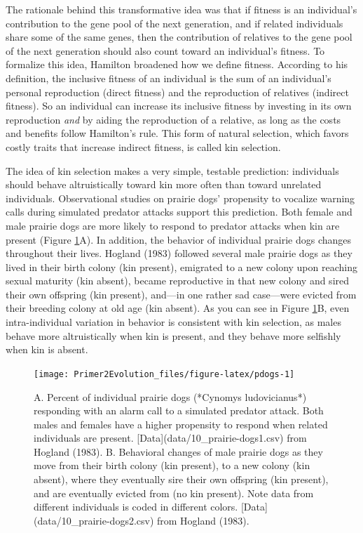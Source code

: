\documentclass[
]{book}
\begin{document}
The rationale behind this transformative idea was that if fitness is an individual's contribution to the gene pool of the next generation, and if related individuals share some of the same genes, then the contribution of relatives to the gene pool of the next generation should also count toward an individual's fitness. To formalize this idea, Hamilton broadened how we define fitness. According to his definition, the inclusive fitness of an individual is the sum of an individual's personal reproduction (direct fitness) and the reproduction of relatives (indirect fitness). So an individual can increase its inclusive fitness by investing in its own reproduction \emph{and} by aiding the reproduction of a relative, as long as the costs and benefits follow Hamilton's rule. This form of natural selection, which favors costly traits that increase indirect fitness, is called kin selection.

The idea of kin selection makes a very simple, testable prediction: individuals should behave altruistically toward kin more often than toward unrelated individuals. Observational studies on prairie dogs' propensity to vocalize warning calls during simulated predator attacks support this prediction. Both female and male prairie dogs are more likely to respond to predator attacks when kin are present (Figure \ref{fig:pdogs}A). In addition, the behavior of individual prairie dogs changes throughout their lives. Hogland (1983) followed several male prairie dogs as they lived in their birth colony (kin present), emigrated to a new colony upon reaching sexual maturity (kin absent), became reproductive in that new colony and sired their own offspring (kin present), and---in one rather sad case---were evicted from their breeding colony at old age (kin absent). As you can see in Figure \ref{fig:pdogs}B, even intra-individual variation in behavior is consistent with kin selection, as males behave more altruistically when kin is present, and they behave more selfishly when kin is absent.

\begin{figure}
\texttt{[image: Primer2Evolution\_files/figure-latex/pdogs-1]} \caption{A. Percent of individual prairie dogs (*Cynomys ludovicianus*) responding with an alarm call to a  simulated predator attack. Both males and females have a higher propensity to respond when related individuals are present. [Data](data/10_prairie-dogs1.csv) from Hogland (1983). B. Behavioral changes of male prairie dogs as they move from their birth colony (kin present), to a new colony (kin absent), where they eventually sire their own offspring (kin present), and are eventually evicted from (no kin present). Note data from different individuals is coded in different colors. [Data](data/10_prairie-dogs2.csv) from Hogland (1983).}\label{fig:pdogs}
\end{figure}
\end{document}
